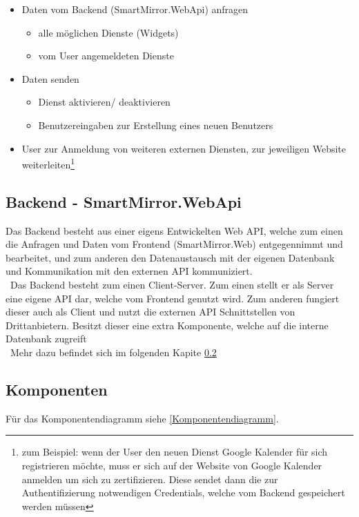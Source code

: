 \begin{itemize}
\item Daten vom Backend (SmartMirror.WebApi) anfragen
\begin{itemize}
\item alle möglichen Dienste (Widgets)
\item vom User angemeldeten Dienste
\end{itemize}
\item Daten senden
\begin{itemize}
\item Dienst aktivieren/ deaktivieren
\item Benutzereingaben zur Erstellung eines neuen Benutzers
\end{itemize}
\item User zur Anmeldung von weiteren externen Diensten, zur jeweiligen Website weiterleiten\footnote{zum Beispiel: wenn der User den neuen Dienst Google Kalender für sich registrieren möchte, muss er sich auf der Website von Google Kalender anmelden um sich zu zertifizieren. Diese sendet dann die zur Authentifizierung notwendigen Credentials, welche vom Backend gespeichert werden müssen }
\end{itemize} 

\subsection{Backend - SmartMirror.WebApi}
Das Backend besteht aus einer eigens Entwickelten Web API, welche zum einen die Anfragen und Daten vom Frontend (SmartMirror.Web) entgegennimmt und bearbeitet, und zum anderen den Datenaustausch mit der eigenen Datenbank und Kommunikation mit den externen API kommuniziert.\\\
Das Backend besteht zum einen Client-Server. Zum einen stellt er als Server eine eigene API dar, welche vom Frontend genutzt wird. Zum anderen fungiert dieser auch als Client und nutzt die externen API Schnittstellen von Drittanbietern. Besitzt dieser eine extra Komponente, welche auf die interne Datenbank zugreift\\\
Mehr dazu befindet sich im folgenden Kapite \ref{Komponenten}



\subsection{Komponenten}\label{Komponenten}
Für das Komponentendiagramm siehe \ref{Komponentendiagramm}.
